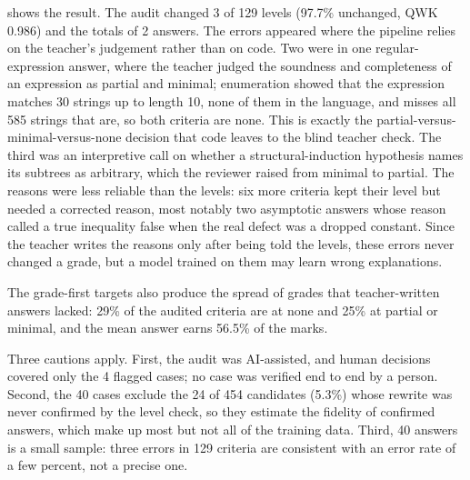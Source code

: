 \documentclass[11pt,a4paper]{article}
\newif\ifdraft
\newcommand{\todo}[2]{%
  \ifdraft\textcolor{red}{\textbf{[TODO #1:} #2\textbf{]}}\fi}
\newcommand{\lvl}[1]{\textsf{#1}}
\theoremstyle{definition}
\begin{document}
 shows the result. The audit changed 3 of 129 levels (97.7\% unchanged, QWK 0.986) and the totals of 2 answers. The errors appeared where the pipeline relies on the teacher's judgement rather than on code. Two were in one regular-expression answer, where the teacher judged the soundness and completeness of an expression as \lvl{partial} and \lvl{minimal}; enumeration showed that the expression matches 30 strings up to length 10, none of them in the language, and misses all 585 strings that are, so both criteria are \lvl{none}. This is exactly the \lvl{partial}-versus-\lvl{minimal}-versus-\lvl{none} decision that code leaves to the blind teacher check. The third was an interpretive call on whether a structural-induction hypothesis names its subtrees as arbitrary, which the reviewer raised from \lvl{minimal} to \lvl{partial}. The reasons were less reliable than the levels: six more criteria kept their level but needed a corrected reason, most notably two asymptotic answers whose reason called a true inequality false when the real defect was a dropped constant. Since the teacher writes the reasons only after being told the levels, these errors never changed a grade, but a model trained on them may learn wrong explanations.

The grade-first targets also produce the spread of grades that teacher-written answers lacked: 29\% of the audited criteria are at \lvl{none} and 25\% at \lvl{partial} or \lvl{minimal}, and the mean answer earns 56.5\% of the marks.

Three cautions apply. First, the audit was AI-assisted, and human decisions covered only the 4 flagged cases; no case was verified end to end by a person. Second, the 40 cases exclude the 24 of 454 candidates (5.3\%) whose rewrite was never confirmed by the level check, so they estimate the fidelity of confirmed answers, which make up most but not all of the training data. Third, 40 answers is a small sample: three errors in 129 criteria are consistent with an error rate of a few percent, not a precise one.
\todo{}{If time allows, have a TA grade a random sample of training answers blind and report the agreement here; it would remove the first two cautions.}
\end{document}
